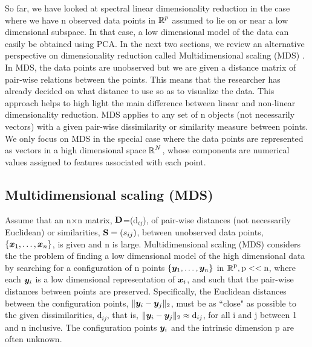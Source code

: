 So far, we have looked at spectral linear dimensionality reduction in the case where we have n observed data points in $\operatorname{\mathbb{R}}^{p}$ assumed to lie on or near a low dimensional subspace. In that case, a low dimensional model of the data can easily be obtained using PCA. In the next two sections, we review an alternative perspective on dimensionality reduction called Multidimensional scaling (MDS) 
\cite{CoxT2000, MardiaK.V1979Ma}. In MDS, the data points are unobserved but we are given a distance matrix of pair-wise relations between the points.
This means that the researcher has already decided on what distance to use so as
to visualize the data. This approach helps to high light the main difference between linear and non-linear dimensionality reduction. MDS applies to any set of n objects (not necessarily vectors) with a given pair-wise dissimilarity
or similarity measure between points. We only focus on MDS in the special case where the data points are represented as vectors in a high dimensional space $\operatorname{\mathbb{R}}^{N}$, whose components are numerical values assigned to features associated with each point.


%



\subsection{Multidimensional scaling (MDS)}
Assume that an n$\times$n matrix, $\textbf{D}$=(d$_{ij}$), of pair-wise distances
(not necessarily Euclidean) or similarities, $\textbf{S} = (s_{ij})$, between unobserved  data points, $\{\boldsymbol{x}_{1}, \ldots, \boldsymbol{x}_{n} \}$, is given and n is large.
Multidimensional scaling (MDS) \cite{CoxT2000, MardiaK.V1979Ma} considers the the problem of finding a low dimensional model of the high dimensional data by searching for a configuration of n points $\{\boldsymbol{y}_{1}, \ldots, \boldsymbol{y}_{n} \}$ in $\operatorname{\mathbb{R}}^{\text{p}}, \text{p} << \text{n}$, where each $\boldsymbol{y}_{i}$ is a low dimensional representation of $\boldsymbol{x}_{i}$, and such that the pair-wise distances between points are preserved. Specifically, the Euclidean distances between the configuration points, $\lVert\boldsymbol{y}_{i} - \boldsymbol{y}_{j}\rVert_{2}$, must be as ``close" as possible to  the given dissimilarities, d$_{ij}$, that is, $\lVert\boldsymbol{y}_{i} - \boldsymbol{y}_{j}\rVert_{2} \approx \text{d}_{ij}$, for all i and j between 1 and n inclusive. The configuration points $\boldsymbol{y}_{i}$ and the intrinsic dimension 
p are often unknown.\\

